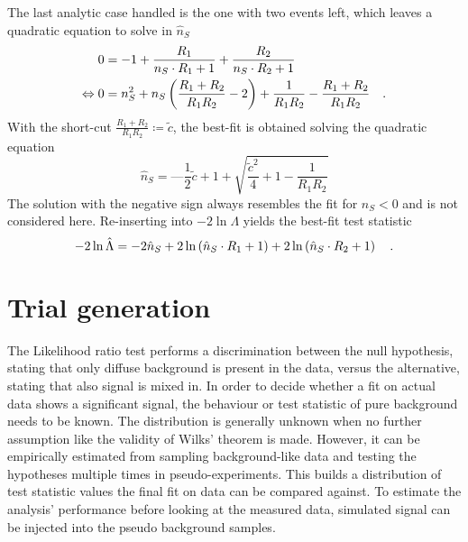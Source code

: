 The last analytic case handled is the one with two events left, which leaves a quadratic equation to solve in $\hat{n}_S$
\begin{align}
  0 &= -1 + \frac{R_1}{n_S\cdot R_1 + 1} + \frac{R_2}{n_S\cdot R_2 + 1} \\
  \Leftrightarrow
  0 &= n_S^2 + n_S \left(\frac{R_1 + R_2}{R_1 R_2} - 2\right) +
       \frac{1}{R_1 R_2} - \frac{R_1 + R_2}{R_1 R_2}
  \quad\text{.}
\end{align}
With the short-cut $\frac{R_1 + R_2}{R_1 R_2} \coloneqq\tilde{c}$, the best-fit is obtained solving the quadratic equation
\begin{equation}
  \hat{n}_S = —\frac{1}{2}\tilde{c} + 1 + \sqrt{\frac{\tilde{c}^2}{4} + 1 - \frac{1}{R_1 R_2}}
\end{equation}
The solution with the negative sign always resembles the fit for $n_S < 0$ and is not considered here.
Re-inserting into $-2\ln\Lambda$ yields the best-fit test statistic
\begin{equation}
  -2\ln\hat{\Lambda}
  = -2\hat{n}_S +
      2\ln\left( \hat{n}_S \cdot R_1 + 1 \right) +
      2\ln\left( \hat{n}_S \cdot R_2 + 1 \right)
  \quad\text{.}
\end{equation}


\section{Trial generation}
The Likelihood ratio test performs a discrimination between the null hypothesis, stating that only diffuse background is present in the data, versus the alternative, stating that also signal is mixed in.
In order to decide whether a fit on actual data shows a significant signal, the behaviour or test statistic of pure background needs to be known.
The distribution is generally unknown when no further assumption like the validity of Wilks' theorem is made.
However, it can be empirically estimated from sampling background-like data and testing the hypotheses multiple times in pseudo-experiments.
This builds a distribution of test statistic values the final fit on data can be compared against.
To estimate the analysis' performance before looking at the measured data, simulated signal can be injected into the pseudo background samples.

